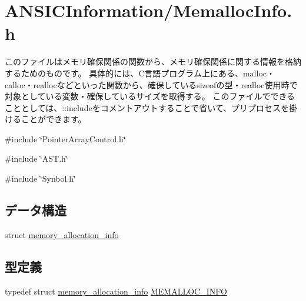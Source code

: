 \section{ANSICInformation/MemallocInfo.h}
\label{MemallocInfo_8h}


このファイルはメモリ確保関係の関数から、メモリ確保関係に関する情報を格納するためのものです。 具体的には、C言語プログラム上にある、malloc・calloc・reallocなどといった関数から、確保しているsizeofの型・realloc使用時で対象としている変数・確保しているサイズを取得する。 このファイルでできることとしては、::includeをコメントアウトすることで省いて、プリプロセスを掛けることができます。  


{\ttfamily \#include \char`\"{}PointerArrayControl.h\char`\"{}}\par
{\ttfamily \#include \char`\"{}AST.h\char`\"{}}\par
{\ttfamily \#include \char`\"{}Synbol.h\char`\"{}}\par
\subsection*{データ構造}
\begin{DoxyCompactItemize}
\item 
struct \hyperlink{structmemory__allocation__info}{memory\_\-allocation\_\-info}
\end{DoxyCompactItemize}
\subsection*{型定義}
\begin{DoxyCompactItemize}
\item 
typedef struct \hyperlink{structmemory__allocation__info}{memory\_\-allocation\_\-info} \hyperlink{MemallocInfo_8h_ac195f09baa3fd86235c8bf9c0c103888}{MEMALLOC\_\-INFO}
\end{DoxyCompactItemize}
